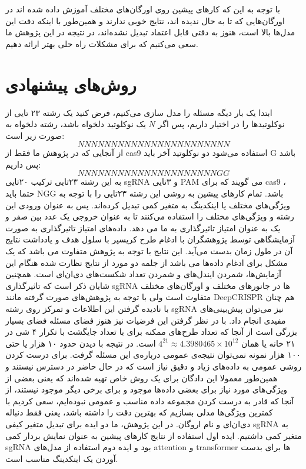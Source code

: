 \documentclass[12pt,a4paper,BCOR=.7cm,headsepline,bibliography=totoc]{report}
\begin{document}
با توجه به این که کار‌های پیشین روی اورگان‌های مختلف آموزش داده شده اند در اورگان‌هایی که تا به حال ندیده اند، نتایج خوبی ندارند و همین‌طور با اینکه دقت این مدل‌ها بالا است، هنوز به دقتی قابل اعتماد تبدیل نشده‌اند، در نتیجه در این پژوهش ما سعی می‌کنیم که برای مشکلات راه حلی بهتر ارائه دهیم.

\chapter{روش‌های پیشنهادی}
ابتدا یک بار دیگه مسئله را مدل سازی می‌کنیم، فرض کنید یک رشته ۲۳ تایی از نوکلوتید‌ها را در اختیار داریم، پس اگر $N$ یک نوکلوتید دلخواه باشد، رشته دلخواه به صورت زیر است:
$$
NNNNNNNNNNNNNNNNNNNNNNN
$$
از آنجایی که در پژوهش ما فقط از cas9 استفاده می‌شود دو نوکلوتید آخر باید G باشد پس داریم:
$$
NNNNNNNNNNNNNNNNNNNNNGG
$$
به این رشته ۲۳تایی ترکیب ۲۰‌تایی sgRNA و ۳تایی PAM می گویند که برای cas9 ، حتما باید NGG باشد. 
تمام کارهای پیشین به روشی این رشته ۲۳تایی را با توجه به ویژگی‌های مختلف یا اینکدینگ به متغیر کمی تبدیل کرده‌اند. پس به عنوان ورودی این رشته و ویژگی‌های مختلف را استفاده می‌کنند تا به عنوان خروجی یک عدد بین صفر و یک به عنوان امتیاز تاثیرگذاری به ما می دهد. داده‌های امتیاز تاثیرگذاری به صورت آزمایشگاهی توسط پژوهشگران با ادغام طرح کریسپر با سلول هدف و یادداشت نتایج آن در طول زمان بدست می‌آید. این نتایج با توجه به پژوهش متفاوت می باشد که یک مشکل برای ادغام داده‌ها می باشد از جلمه دو مورد از نتایج نظارت شده هنگام این آزمایش‌ها، شمردن ایندل‌های و شمردن تعداد شکست‌های دی‌ان‌ای است. همچنین شایان ذکر است که تاثیرگذاری sgRNA ها در جانور‌های مختلف و اورگان‌های مختلف متفاوت است ولی با توجه به پژوهش‌های صورت گرفته مانند DeepCRISPR \cite{DeepCRISPR} هم چنان با نادیده گرفتن این اطلاعات و تمرکز روی رشته sgRNA نیز می‌توان پیش‌بینی‌های مفیدی انجام داد. با در نظر گرفتن این فرضیات نیز هنوز فضای مسئله فضای بسیار بزرگی است از آنجا که تعداد طرح‌های ممکنه برای با تعداد جایگشت با تکرار ۴ شی در ۲۱ خانه یا همان 
$4^{21} \approx 4.3980465 \times 10^{12}$
است. در نتیجه با دیدن حدود ۱۰ هزار یا حتی ۱۰۰ هزار نمونه نمی‌توان نتیجه‌ی عمومی درباره‌ی این مسئله گرفت.
برای درست کردن روشی عمومی به داده‌های زیاد و دقیق نیاز است که در حال حاضر در دسترس نیستند و همین‌طور معمولا این دادگان برای یک روش خاص تهیه شده‌اند که یعنی بعضی از ویژگی‌های مورد نیاز برای بعضی داده‌ها موجود و برای برخی دیگر موجود نیستند، از آنجا که قادر به درست کردن مجموعه داده مناسب و عمومی نبوده‌ایم، سعی کردیم با کمترین ویژگی‌ها مدلی بسازیم که بهترین دقت را داشته باشد، یعنی فقط دنباله دی‌ان‌ای و نام اروگان. در این پژوهش، ما دو ایده برای تبدیل متغیر کیفی sgRNA به متغیر کمی داشتیم. ایده اول استفاده از نتایج کار‌های پیشین به عنوان نمایش بردار کمی sgRNA بود و ایده دوم استفاده از مدل‌های attention و transformer ها برای بدست آوردن یک اینکدینگ مناسب است.
\end{document}
